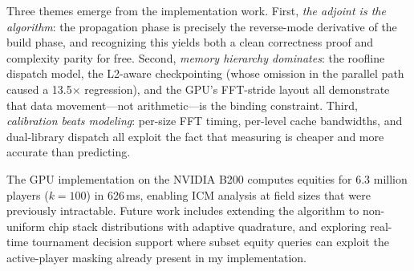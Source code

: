 \documentclass[11pt]{article}
\begin{document}
Three themes emerge from the implementation work. First,
\emph{the adjoint is the algorithm}: the propagation phase is precisely
the reverse-mode derivative of the build phase, and recognizing this
yields both a clean correctness proof and complexity parity for free.
Second, \emph{memory hierarchy dominates}: the roofline dispatch model,
the L2-aware checkpointing (whose omission in the parallel path caused
a 13.5$\times$ regression), and the GPU's FFT-stride layout all
demonstrate that data movement---not arithmetic---is the binding
constraint. Third, \emph{calibration beats modeling}: per-size FFT
timing, per-level cache bandwidths, and dual-library dispatch all exploit
the fact that measuring is cheaper and more accurate than predicting.

The GPU implementation on the NVIDIA B200 computes equities for
6.3 million players ($k = 100$) in 626\,ms, enabling ICM analysis at
field sizes that were previously intractable. Future work includes
extending the algorithm to non-uniform chip stack distributions with
adaptive quadrature, and exploring real-time tournament decision support
where subset equity queries can exploit the active-player masking already
present in my implementation.



\end{document}

